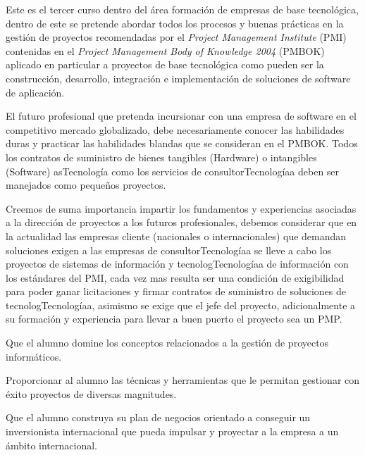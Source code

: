 \begin{syllabus}


\begin{justification}
Este es el tercer curso dentro del área formación de empresas de base tecnológica, 
dentro de este se pretende abordar todos los procesos y buenas prácticas en la 
gestión de proyectos recomendadas por el \textit{Project Management Institute} (PMI) 
contenidas en el \textit{Project Management Body of Knowledge 2004} (PMBOK)  
aplicado en particular a proyectos de base tecnológica como pueden ser la 
construcción, desarrollo, integración e implementación de soluciones de 
software de aplicación.

El futuro profesional que pretenda incursionar con una empresa de 
software en el competitivo mercado globalizado, debe necesariamente 
conocer las habilidades duras y practicar las habilidades blandas que se 
consideran en el PMBOK. Todos los contratos de suministro de bienes 
tangibles (Hardware) o intangibles (Software) asTecnología como los servicios de 
consultorTecnologíaa deben ser manejados como pequeños proyectos.

Creemos de suma importancia impartir los fundamentos y experiencias 
asociadas a la dirección de proyectos a los futuros profesionales, 
debemos considerar que en la actualidad las empresas cliente 
(nacionales o internacionales) que demandan soluciones exigen a 
las empresas de consultorTecnologíaa se lleve a cabo los proyectos de sistemas 
de información y tecnologTecnologíaa de información con los estándares del PMI, 
cada vez mas resulta ser una condición de exigibilidad para poder ganar 
licitaciones y firmar contratos de suministro de soluciones de tecnologTecnologíaa, 
asimismo se exige que el jefe del proyecto, adicionalmente a su formación y 
experiencia para llevar a buen puerto el proyecto sea un PMP.
\end{justification}

\begin{goals}
\item Que el alumno domine los conceptos relacionados a la gestión de proyectos informáticos.
\item Proporcionar al alumno las técnicas y herramientas que le permitan gestionar con éxito proyectos de diversas magnitudes.
\item Que el alumno construya su plan de negocios orientado a conseguir un inversionista internacional que pueda impulsar y proyectar a la empresa a un ámbito internacional.
\end{goals}


\end{syllabus}
